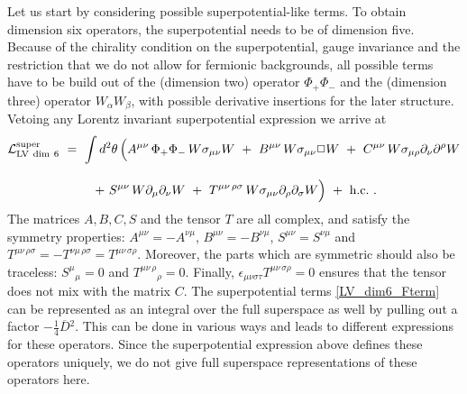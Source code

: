 \documentclass[12pt]{revtex4}
\begin{document}
Let us start by considering possible superpotential-like terms. 
To obtain dimension six operators, the superpotential needs to be of
dimension five. Because of the chirality condition on the superpotential,
gauge invariance and the restriction that we do not allow for
fermionic backgrounds,  all possible terms have to be build out of the
(dimension two) operator $\Phi_+ \Phi_-$ and the (dimension three)
operator $W_\alpha W_\beta$, with possible derivative insertions for 
the later structure. Vetoing any Lorentz invariant superpotential
expression we arrive at 
\begin{gather} 
{\cal L}_{\rm{LV\ dim\ 6}}^{\rm{super}} ~=~ 
\int d^2 \theta \, \Big( 
A^{\mu\nu} \, \Phi_+ \Phi_-\, W \sigma_{\mu\nu} W ~+~ 
B^{\mu\nu} \, W \sigma_{\mu\nu} \Box W ~+~ 
C^{\mu\nu} \, W \sigma_{\mu\rho} \partial_\nu \partial^\rho W 
\nonumber \\[2ex]
~+~ 
S^{\mu\nu}\, W \partial_\mu \partial_\nu W ~+~ 
T^{\mu\nu\, \rho\sigma} \, 
W \sigma_{\mu\nu} \partial_\rho \partial_\sigma W 
\Big) ~+~ \text{h.c.}~. 
\label{LV_dim6_Fterm}
\end{gather}
The matrices $A, B, C, S$ and the tensor $T$ are all complex,
and satisfy the symmetry properties: $A^{\mu\nu} = -A^{\nu\mu}$, 
$B^{\mu\nu} = -B^{\nu\mu}$, 
$S^{\mu\nu} =S^{\nu\mu}$ and 
$T^{\mu\nu\, \rho\sigma} = -T^{\nu\mu\, \rho\sigma} = 
T^{\mu\nu\, \sigma\rho}$. Moreover, the parts which are symmetric
should also be traceless: $S^\mu{}_\mu=0$ and 
$T^{\mu\nu\, \rho}{}_\rho = 0$. Finally,  
$\epsilon_{\mu\nu\sigma\tau}T^{\mu\nu\, \sigma\rho} = 0$ ensures that
the tensor does not mix with the matrix $C$. 
The superpotential terms \eqref{LV_dim6_Fterm} can be represented 
as an integral over the full superspace as well by pulling out a
factor $-\frac 14 \overline{D}{}^2$. This can be done in various ways
and leads to different expressions for these
operators. Since the superpotential expression above defines these 
operators uniquely, we do not give full superspace representations of
these operators here. 
\end{document}
